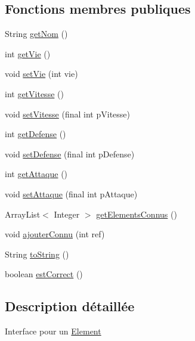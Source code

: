 \subsection*{Fonctions membres publiques}
\begin{DoxyCompactItemize}
\item 
String \hyperlink{interfaceindividu_1_1_i_element_a7783ed1b115d522ddd6a8a0c2aded632}{get\-Nom} ()
\item 
int \hyperlink{interfaceindividu_1_1_i_element_a2f5272cb7b7f334bb9352cc2010c0abe}{get\-Vie} ()
\item 
void \hyperlink{interfaceindividu_1_1_i_element_a386d0b896afaf5481da8c6f667b11297}{set\-Vie} (int vie)
\item 
int \hyperlink{interfaceindividu_1_1_i_element_a824b3ce0b020526307476e9a50a98518}{get\-Vitesse} ()
\item 
void \hyperlink{interfaceindividu_1_1_i_element_a50c000c10b016186ff3becd67ae5d5ae}{set\-Vitesse} (final int p\-Vitesse)
\item 
int \hyperlink{interfaceindividu_1_1_i_element_a9299fee825c29161f0e8bc401fbf36c3}{get\-Defense} ()
\item 
void \hyperlink{interfaceindividu_1_1_i_element_a3a877d4f796c0b27d12cbd7f1ebd0b46}{set\-Defense} (final int p\-Defense)
\item 
int \hyperlink{interfaceindividu_1_1_i_element_a2994427419f339274b17290846d259b9}{get\-Attaque} ()
\item 
void \hyperlink{interfaceindividu_1_1_i_element_a7ebc66e084c6063079f1db0543ba2dcc}{set\-Attaque} (final int p\-Attaque)
\item 
Array\-List$<$ Integer $>$ \hyperlink{interfaceindividu_1_1_i_element_abb2ad9e31a3500c3c4deaaf58f9e01c9}{get\-Elements\-Connus} ()
\item 
void \hyperlink{interfaceindividu_1_1_i_element_a8c265785d6fb0f25cc54ec5850c602d3}{ajouter\-Connu} (int ref)
\item 
String \hyperlink{interfaceindividu_1_1_i_element_a4609baa01e8f8558e931b2f8901e789d}{to\-String} ()
\item 
boolean \hyperlink{interfaceindividu_1_1_i_element_ab23f762049d3df68aa63a031023df646}{est\-Correct} ()
\end{DoxyCompactItemize}


\subsection{Description détaillée}
Interface pour un \hyperlink{classindividu_1_1_element}{Element} 

